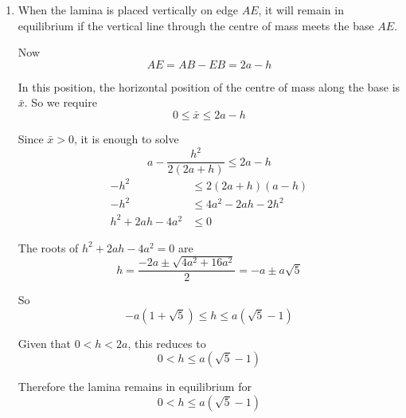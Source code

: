 \documentclass[leqno]{article}
\begin{document}
\begin{enumerate}[
  label=\textbf{\arabic*.},
  leftmargin=*,
  topsep=0pt,
  partopsep=0pt,
  parsep=0pt
]
\begin{djsSolution}
\begin{enumerate}[label=\textbf{(\alph*)}, start=1]
Taking moments about \(AB\):
\[
(4a^2-h^2)\bar y=4a^2(a)-h^2\left(\frac h2\right)
\]
\begin{align*}
\bar y&=\frac{4a^3-\frac12h^3}{4a^2-h^2}\\
&=\frac{a(4a^2-h^2)+\frac12h^2(2a-h)}{(2a-h)(2a+h)}\\
&=a+\frac{h^2}{2(2a+h)}
\end{align*}

Therefore the centre of mass is at distance
\[
a-\frac{h^2}{2(2a+h)}
\]

from \(AD\), and at distance
\[
a+\frac{h^2}{2(2a+h)}
\]

from \(AB\).

  \item When the lamina is placed vertically on edge \(AE\), it will remain in equilibrium if the vertical line through the centre of mass meets the base \(AE\).

Now
\[
AE=AB-EB=2a-h
\]

In this position, the horizontal position of the centre of mass along the base is \(\bar x\). So we require
\[
0\le \bar x\le 2a-h
\]

Since \(\bar x>0\), it is enough to solve
\[
a-\frac{h^2}{2(2a+h)}\le 2a-h
\]
\begin{align*}
-h^2&\le 2(2a+h)(a-h)\\
-h^2&\le 4a^2-2ah-2h^2\\
h^2+2ah-4a^2&\le 0
\end{align*}

The roots of \(h^2+2ah-4a^2=0\) are
\[
h=\frac{-2a\pm\sqrt{4a^2+16a^2}}{2}=-a\pm a\sqrt5
\]

So
\[
-a(1+\sqrt5)\le h\le a(\sqrt5-1)
\]

Given that \(0<h<2a\), this reduces to
\[
0<h\le a(\sqrt5-1)
\]

Therefore the lamina remains in equilibrium for
\[
0<h\le a(\sqrt5-1)
\]
\end{enumerate}
\end{djsSolution}


\newpage

\questionitem

\begin{figure}[H]
    \centering
{}
\end{figure}
\end{enumerate}
\end{document}
